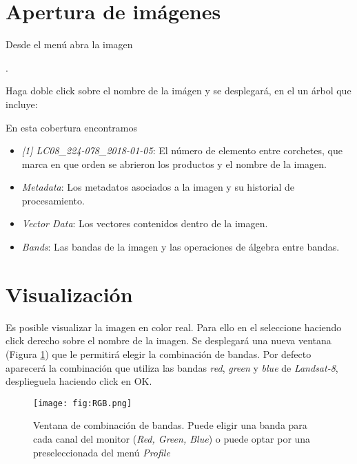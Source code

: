 \section{Apertura de imágenes}

Desde el menú  abra la imagen
\begin{center} .
\end{center}
Haga doble click sobre el nombre de la imágen y se desplegará, en el  un árbol que incluye:
\\

En esta cobertura encontramos

\begin{itemize}
    \item \emph{[1] LC08\_224-078\_2018-01-05}: El número de elemento entre corchetes, que marca en que orden se abrieron los productos y el nombre de la imagen.
    \item \emph{Metadata}: Los metadatos asociados a la imagen y su historial de procesamiento.
    \item \emph{Vector Data}: Los vectores contenidos dentro de la imagen.
    \item \emph{Bands}: Las bandas de la imagen y las operaciones de álgebra entre bandas.
\end{itemize}

\section{Visualización}

Es posible visualizar la imagen en color real. Para ello en el  seleccione  haciendo click derecho sobre el nombre de la imagen. Se desplegará una nueva ventana (Figura \ref{fig:RGB}) que le permitirá elegir la combinación de bandas. Por defecto aparecerá la combinación que utiliza las bandas \emph{red}, \emph{green} y \emph{blue} de \emph{Landsat-8}, desplieguela haciendo click en OK.

\begin{figure}[h!]
    \centering
    \texttt{[image: fig:RGB.png]}
    \caption{Ventana de combinación de bandas. Puede eligir una banda para cada canal del monitor (\emph{Red, Green, Blue}) o puede optar por una preseleccionada del menú \emph{Profile}}
    \label{fig:RGB}
\end{figure}

